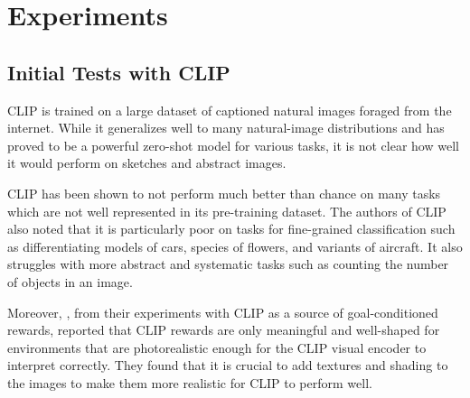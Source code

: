 \chapter{Experiments}
\label{sec:experiments}


\section{Initial Tests with CLIP}
\label{sec:clip-custom}

CLIP is trained on a large dataset of captioned natural images foraged from the internet.
While it generalizes well to many natural-image distributions and has proved to be a powerful zero-shot model for various tasks, it is not clear how well it would perform on sketches and abstract images. 

CLIP has been shown to not perform much better than chance on many tasks which are not well represented in its pre-training dataset.
The authors of CLIP also noted that it is particularly poor on tasks for fine-grained classification such as differentiating models of cars, species of flowers, and variants of aircraft.
It also struggles with more abstract and systematic tasks such as counting the number of objects in an image.

Moreover, \cite{vlmrm}, from their experiments with CLIP as a source of goal-conditioned rewards, reported that CLIP rewards are only meaningful and well-shaped for environments that are photorealistic enough for the CLIP visual encoder to interpret correctly.
They found that it is crucial to add textures and shading to the images to make them more realistic for CLIP to perform well.

